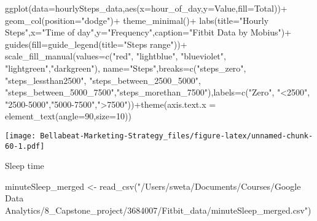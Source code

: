 \documentclass[
]{article}
\newenvironment{Shaded}{\begin{snugshade}}{\end{snugshade}}
\newcommand{\AttributeTok}[1]{\textcolor[rgb]{0.77,0.63,0.00}{#1}}
\newcommand{\DecValTok}[1]{\textcolor[rgb]{0.00,0.00,0.81}{#1}}
\newcommand{\FunctionTok}[1]{\textcolor[rgb]{0.00,0.00,0.00}{#1}}
\newcommand{\NormalTok}[1]{#1}
\newcommand{\OtherTok}[1]{\textcolor[rgb]{0.56,0.35,0.01}{#1}}
\newcommand{\SpecialCharTok}[1]{\textcolor[rgb]{0.00,0.00,0.00}{#1}}
\newcommand{\StringTok}[1]{\textcolor[rgb]{0.31,0.60,0.02}{#1}}
\begin{document}
\begin{Shaded}
\begin{Highlighting}[]
\FunctionTok{ggplot}\NormalTok{(}\AttributeTok{data=}\NormalTok{hourlySteps\_data,}\FunctionTok{aes}\NormalTok{(}\AttributeTok{x=}\NormalTok{hour\_of\_day,}\AttributeTok{y=}\NormalTok{Value,}\AttributeTok{fill=}\NormalTok{Total))}\SpecialCharTok{+}
  \FunctionTok{geom\_col}\NormalTok{(}\AttributeTok{position=}\StringTok{"dodge"}\NormalTok{)}\SpecialCharTok{+}
  \FunctionTok{theme\_minimal}\NormalTok{()}\SpecialCharTok{+}
  \FunctionTok{labs}\NormalTok{(}\AttributeTok{title=}\StringTok{"Hourly Steps"}\NormalTok{,}\AttributeTok{x=}\StringTok{"Time of day"}\NormalTok{,}\AttributeTok{y=}\StringTok{"Frequency"}\NormalTok{,}\AttributeTok{caption=}\StringTok{"Fitbit Data by Mobius"}\NormalTok{)}\SpecialCharTok{+}
  \FunctionTok{guides}\NormalTok{(}\AttributeTok{fill=}\FunctionTok{guide\_legend}\NormalTok{(}\AttributeTok{title=}\StringTok{"Steps range"}\NormalTok{))}\SpecialCharTok{+}
  \FunctionTok{scale\_fill\_manual}\NormalTok{(}\AttributeTok{values=}\FunctionTok{c}\NormalTok{(}\StringTok{"red"}\NormalTok{, }\StringTok{"lightblue"}\NormalTok{, }\StringTok{"blueviolet"}\NormalTok{, }\StringTok{"lightgreen"}\NormalTok{,}\StringTok{"darkgreen"}\NormalTok{), }\AttributeTok{name=}\StringTok{"Steps"}\NormalTok{,}\AttributeTok{breaks=}\FunctionTok{c}\NormalTok{(}\StringTok{"steps\_zero"}\NormalTok{, }\StringTok{"steps\_lessthan2500"}\NormalTok{, }\StringTok{"steps\_between\_2500\_5000"}\NormalTok{, }\StringTok{"steps\_between\_5000\_7500"}\NormalTok{,}\StringTok{"steps\_morethan\_7500"}\NormalTok{),}\AttributeTok{labels=}\FunctionTok{c}\NormalTok{(}\StringTok{"Zero"}\NormalTok{, }\StringTok{"\textless{}2500"}\NormalTok{, }\StringTok{"2500{-}5000"}\NormalTok{,}\StringTok{"5000{-}7500"}\NormalTok{,}\StringTok{"\textgreater{}7500"}\NormalTok{))}\SpecialCharTok{+}\FunctionTok{theme}\NormalTok{(}\AttributeTok{axis.text.x =} \FunctionTok{element\_text}\NormalTok{(}\AttributeTok{angle=}\DecValTok{90}\NormalTok{,}\AttributeTok{size=}\DecValTok{10}\NormalTok{))}
\end{Highlighting}
\end{Shaded}

\texttt{[image: Bellabeat-Marketing-Strategy\_files/figure-latex/unnamed-chunk-60-1.pdf]}

Sleep time

\begin{Shaded}
\begin{Highlighting}[]
\NormalTok{minuteSleep\_merged }\OtherTok{\textless{}{-}} \FunctionTok{read\_csv}\NormalTok{(}\StringTok{"/Users/sweta/Documents/Courses/Google Data Analytics/8\_Capstone\_project/3684007/Fitbit\_data/minuteSleep\_merged.csv"}\NormalTok{)}
\end{Highlighting}
\end{Shaded}
\end{document}
